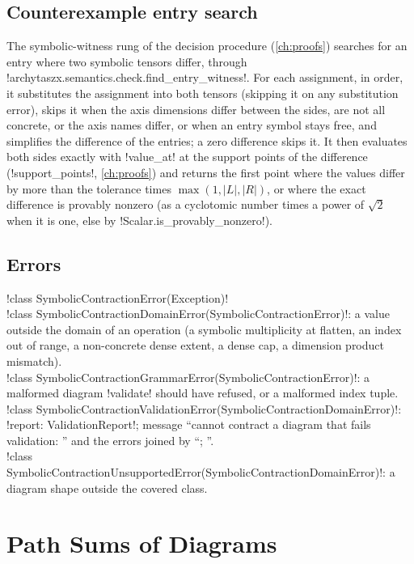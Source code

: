 \subsection{Counterexample entry search}\label{sec:semantics-entry-search}

The symbolic-witness rung of the decision procedure (\cref{ch:proofs}) searches for an entry where two symbolic tensors differ, through \py!archytaszx.semantics.check.find_entry_witness!. For each assignment, in order, it substitutes the assignment into both tensors (skipping it on any substitution error), skips it when the axis dimensions differ between the sides, are not all concrete, or the axis names differ, or when an entry symbol stays free, and simplifies the difference of the entries; a zero difference skips it. It then evaluates both sides exactly with \py!value_at! at the support points of the difference (\py!support_points!, \cref{ch:proofs}) and returns the first point where the values differ by more than the tolerance times $\max(1,|L|,|R|)$, or where the exact difference is provably nonzero (as a cyclotomic number times a power of $\sqrt2$ when it is one, else by \py!Scalar.is_provably_nonzero!).

\subsection{Errors}

\begin{signature}
\py!class SymbolicContractionError(Exception)!\\
\py!class SymbolicContractionDomainError(SymbolicContractionError)!: a value outside the domain of an operation (a symbolic multiplicity at flatten, an index out of range, a non-concrete dense extent, a dense cap, a dimension product mismatch).\\
\py!class SymbolicContractionGrammarError(SymbolicContractionError)!: a malformed diagram \py!validate! should have refused, or a malformed index tuple.\\
\py!class SymbolicContractionValidationError(SymbolicContractionDomainError)!: \py!report: ValidationReport!; message ``cannot contract a diagram that fails validation: '' and the errors joined by ``; ''.\\
\py!class SymbolicContractionUnsupportedError(SymbolicContractionDomainError)!: a diagram shape outside the covered class.
\end{signature}

\section{Path Sums of Diagrams}\label{sec:semantics-pathsum}

